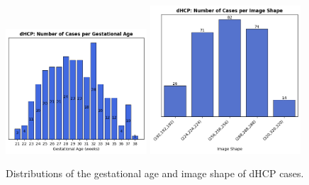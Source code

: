 \begin{figure}[htbp]
    \centering
    \includegraphics[width=0.47\textwidth, valign=t]{figures/dHCP_GA.png}
    \includegraphics[width=0.5\textwidth, valign=t]{figures/dHCP_image_shape.png}
    \caption{Distributions of the gestational age and image shape of dHCP cases.}
    \label{fig:dhcp_plots}
\end{figure}
